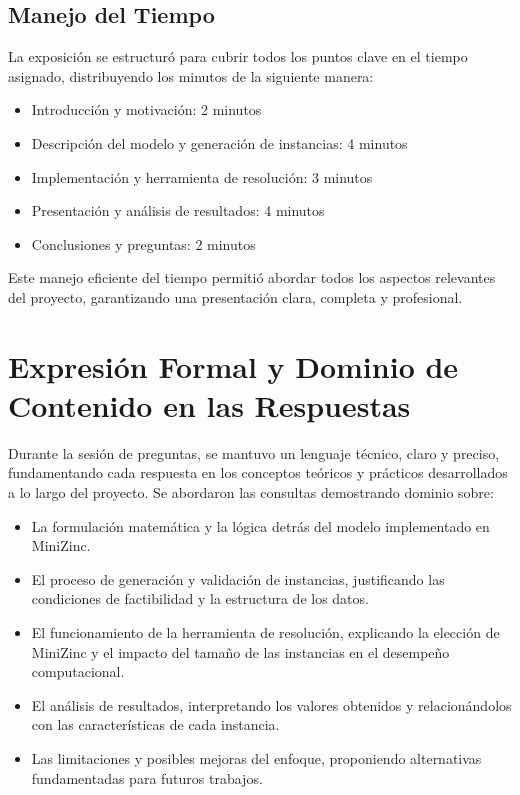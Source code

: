\documentclass[a4paper,12pt]{article}
\begin{document}
\subsection{Manejo del Tiempo}

La exposición se estructuró para cubrir todos los puntos clave en el tiempo asignado, distribuyendo los minutos de la siguiente manera:
\begin{itemize}
    \item Introducción y motivación: 2 minutos
    \item Descripción del modelo y generación de instancias: 4 minutos
    \item Implementación y herramienta de resolución: 3 minutos
    \item Presentación y análisis de resultados: 4 minutos
    \item Conclusiones y preguntas: 2 minutos
\end{itemize}

Este manejo eficiente del tiempo permitió abordar todos los aspectos relevantes del proyecto, garantizando una presentación clara, completa y profesional.
\section{Expresión Formal y Dominio de Contenido en las Respuestas}

Durante la sesión de preguntas, se mantuvo un lenguaje técnico, claro y preciso, fundamentando cada respuesta en los conceptos teóricos y prácticos desarrollados a lo largo del proyecto. Se abordaron las consultas demostrando dominio sobre:

\begin{itemize}
    \item La formulación matemática y la lógica detrás del modelo implementado en MiniZinc.
    \item El proceso de generación y validación de instancias, justificando las condiciones de factibilidad y la estructura de los datos.
    \item El funcionamiento de la herramienta de resolución, explicando la elección de MiniZinc y el impacto del tamaño de las instancias en el desempeño computacional.
    \item El análisis de resultados, interpretando los valores obtenidos y relacionándolos con las características de cada instancia.
    \item Las limitaciones y posibles mejoras del enfoque, proponiendo alternativas fundamentadas para futuros trabajos.
\end{itemize}
\end{document}
